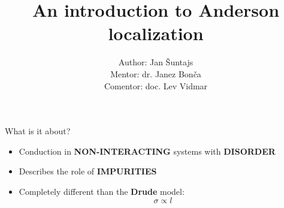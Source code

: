 \documentclass[1pt]{beamer}
\title[Anderson localization ] %
{An introduction to Anderson localization}
\author[Jan Šuntajs] %
{Author: Jan Šuntajs \\ 
Mentor: dr. Janez Bonča \\
Comentor: doc. Lev Vidmar}
\begin{document}
\begin{frame}
  \titlepage
\end{frame}









\begin{frame}{What is it about?}
\begin{minipage}[c]{0.5\textwidth}
\begin{itemize}
\item Conduction in \textbf{NON-INTERACTING} systems with \textbf{DISORDER}
\vspace{5mm}
\item Describes the role of \textbf{IMPURITIES}
\vspace{5mm}
\item Completely different than the \textbf{Drude} model:
$$ \sigma \propto l$$
\vspace{5mm}
\end{itemize}
\end{minipage}
\end{frame}
\end{document}
